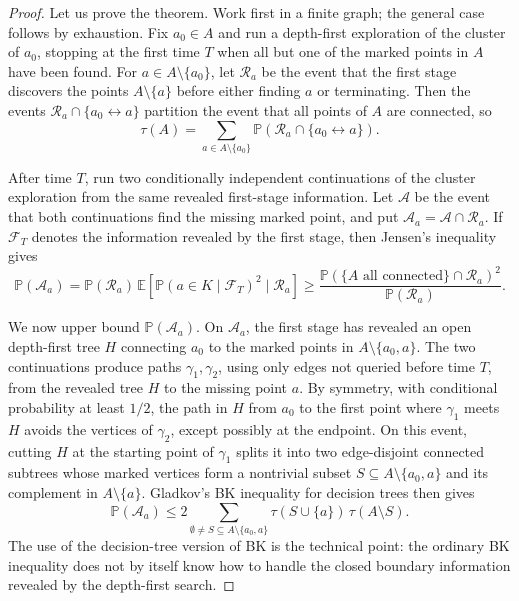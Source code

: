 \documentclass[11pt,reqno]{book}
\numberwithin{equation}{chapter}
\theoremstyle{plain}
\theoremstyle{definition}
\theoremstyle{remark}
\renewcommand{\P}{\mathbb P}
\newcommand{\E}{\mathbb E}
\newcommand{\1}{\mathbf 1}
\begin{document}
\begin{proof}
Let us prove the theorem. Work first in a finite graph; the general case
follows by exhaustion. Fix \(a_0\in A\) and run a depth-first exploration of
the cluster of \(a_0\), stopping at the first time \(T\) when all but one of
the marked points in \(A\) have been found. For
\(a\in A\setminus\{a_0\}\), let \(\mathscr R_a\) be the event that the first
stage discovers the points \(A\setminus\{a\}\) before either finding \(a\) or
terminating. Then the events \(\mathscr R_a\cap\{a_0\leftrightarrow a\}\)
partition the event that all points of \(A\) are connected, so
\[
  \tau(A)
  =
  \sum_{a\in A\setminus\{a_0\}}
  \P(\mathscr R_a\cap\{a_0\leftrightarrow a\}).
\]

After time \(T\), run two conditionally independent continuations of the
cluster exploration from the same revealed first-stage information. Let
\(\mathscr A\) be the event that both continuations find the missing marked
point, and put \(\mathscr A_a=\mathscr A\cap\mathscr R_a\). If
\(\mathcal F_T\) denotes the information revealed by the first stage, then
Jensen's inequality gives
\[
  \P(\mathscr A_a)
  =
  \P(\mathscr R_a)\,
  \E\!\left[
    \P(a\in K\mid \mathcal F_T)^2
    \mid \mathscr R_a
  \right]
  \geq
  \frac{
    \P(\{A\text{ all connected}\}\cap\mathscr R_a)^2
  }{\P(\mathscr R_a)}.
\]

We now upper bound \(\P(\mathscr A_a)\). On \(\mathscr A_a\), the first stage
has revealed an open depth-first tree \(H\) connecting \(a_0\) to the marked
points in \(A\setminus\{a_0,a\}\). The two continuations produce paths
\(\gamma_1,\gamma_2\), using only edges not queried before time \(T\), from
the revealed tree \(H\) to the missing point \(a\). By symmetry, with
conditional probability at least \(1/2\), the path in \(H\) from \(a_0\) to
the first point where \(\gamma_1\) meets \(H\) avoids the vertices of
\(\gamma_2\), except possibly at the endpoint. On this event, cutting \(H\)
at the starting point of \(\gamma_1\) splits it into two edge-disjoint
connected subtrees whose marked vertices form a nontrivial subset
\(S\subseteq A\setminus\{a_0,a\}\) and its complement in
\(A\setminus\{a\}\). Gladkov's BK inequality for decision trees then gives
\[
  \P(\mathscr A_a)
  \leq
  2
  \sum_{\emptyset\ne S\subseteq A\setminus\{a_0,a\}}
  \tau(S\cup\{a\})\,\tau(A\setminus S).
\]
The use of the decision-tree version of BK is the technical point: the
ordinary BK inequality does not by itself know how to handle the closed
boundary information revealed by the depth-first search.


\end{proof}
\end{document}
